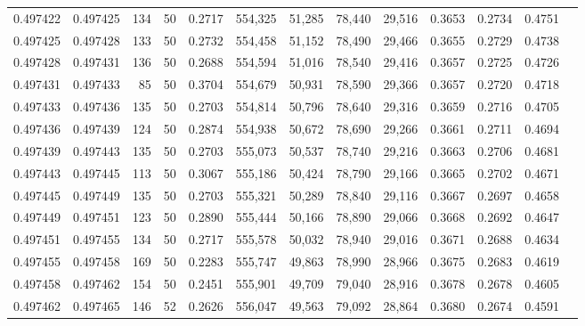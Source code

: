 \begin{tabular}{rrrrrrrrrrrrr}
0.497422 & 0.497425 &   134 &  50 &                                     0.2717 & 554,325 &  51,285 &  78,440 &  29,516 & 0.3653 & 0.2734 & 0.4751 \\
0.497425 & 0.497428 &   133 &  50 &                                     0.2732 & 554,458 &  51,152 &  78,490 &  29,466 & 0.3655 & 0.2729 & 0.4738 \\
0.497428 & 0.497431 &   136 &  50 &                                     0.2688 & 554,594 &  51,016 &  78,540 &  29,416 & 0.3657 & 0.2725 & 0.4726 \\
0.497431 & 0.497433 &    85 &  50 &                                     0.3704 & 554,679 &  50,931 &  78,590 &  29,366 & 0.3657 & 0.2720 & 0.4718 \\
0.497433 & 0.497436 &   135 &  50 &                                     0.2703 & 554,814 &  50,796 &  78,640 &  29,316 & 0.3659 & 0.2716 & 0.4705 \\
0.497436 & 0.497439 &   124 &  50 &                                     0.2874 & 554,938 &  50,672 &  78,690 &  29,266 & 0.3661 & 0.2711 & 0.4694 \\
0.497439 & 0.497443 &   135 &  50 &                                     0.2703 & 555,073 &  50,537 &  78,740 &  29,216 & 0.3663 & 0.2706 & 0.4681 \\
0.497443 & 0.497445 &   113 &  50 &                                     0.3067 & 555,186 &  50,424 &  78,790 &  29,166 & 0.3665 & 0.2702 & 0.4671 \\
0.497445 & 0.497449 &   135 &  50 &                                     0.2703 & 555,321 &  50,289 &  78,840 &  29,116 & 0.3667 & 0.2697 & 0.4658 \\
0.497449 & 0.497451 &   123 &  50 &                                     0.2890 & 555,444 &  50,166 &  78,890 &  29,066 & 0.3668 & 0.2692 & 0.4647 \\
0.497451 & 0.497455 &   134 &  50 &                                     0.2717 & 555,578 &  50,032 &  78,940 &  29,016 & 0.3671 & 0.2688 & 0.4634 \\
0.497455 & 0.497458 &   169 &  50 &                                     0.2283 & 555,747 &  49,863 &  78,990 &  28,966 & 0.3675 & 0.2683 & 0.4619 \\
0.497458 & 0.497462 &   154 &  50 &                                     0.2451 & 555,901 &  49,709 &  79,040 &  28,916 & 0.3678 & 0.2678 & 0.4605 \\
0.497462 & 0.497465 &   146 &  52 &                                     0.2626 & 556,047 &  49,563 &  79,092 &  28,864 & 0.3680 & 0.2674 & 0.4591 \\

\end{tabular}
